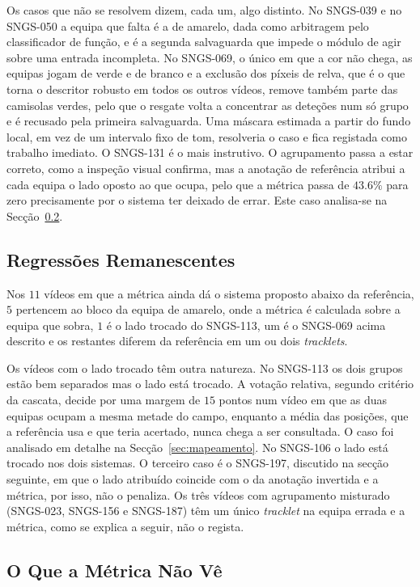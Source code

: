Os casos que não se resolvem dizem, cada um, algo distinto. No SNGS-039 e no SNGS-050 a equipa que
falta é a de amarelo, dada como arbitragem pelo classificador de função, e é a segunda salvaguarda
que impede o módulo de agir sobre uma entrada incompleta. No SNGS-069, o único em que a cor não
chega, as equipas jogam de verde e de branco e a exclusão dos píxeis de relva, que é o que torna o
descritor robusto em todos os outros vídeos, remove também parte das camisolas verdes, pelo que o
resgate volta a concentrar as deteções num só grupo e é recusado pela primeira salvaguarda. Uma
máscara estimada a partir do fundo local, em vez de um intervalo fixo de tom, resolveria o caso e
fica registada como trabalho imediato. O SNGS-131 é o mais instrutivo. O agrupamento passa a estar
correto, como a inspeção visual confirma, mas a anotação de referência atribui a cada equipa o lado
oposto ao que ocupa, pelo que a métrica passa de $43.6\%$ para zero precisamente por o sistema ter
deixado de errar. Este caso analisa-se na Secção~\ref{sec:res_equipa_metrica}.

\subsection{Regressões Remanescentes}\label{sec:res_equipa_regressoes}

Nos $11$ vídeos em que a métrica ainda dá o sistema proposto abaixo da referência,
$5$ pertencem ao bloco da equipa de amarelo, onde a métrica é calculada sobre a equipa
que sobra, $1$ é o lado trocado do SNGS-113, um é o SNGS-069 acima descrito e os restantes
diferem da referência em um ou dois \emph{tracklets}.

Os vídeos com o lado trocado têm outra natureza. No SNGS-113 os dois grupos estão bem
separados mas o lado está trocado. A votação relativa, segundo critério da cascata, decide por uma margem de
$15$ pontos num vídeo em que as duas equipas ocupam a mesma metade do campo, enquanto a média das
posições, que a referência usa e que teria acertado, nunca chega a ser consultada. O caso foi
analisado em detalhe na Secção~\ref{sec:mapeamento}. No SNGS-106 o lado está trocado nos dois
sistemas. O terceiro caso é o SNGS-197, discutido na secção seguinte, em que o lado atribuído
coincide com o da anotação invertida e a métrica, por isso, não o penaliza. Os três vídeos com agrupamento misturado (SNGS-023, SNGS-156 e SNGS-187) têm um único
\emph{tracklet} na equipa errada e a métrica, como se explica a seguir, não o regista.

\subsection{O Que a Métrica Não Vê}\label{sec:res_equipa_metrica}

